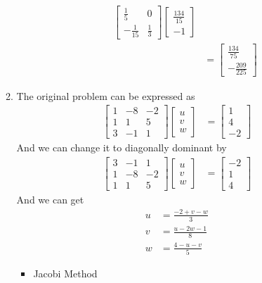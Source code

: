 \documentclass{article}
\begin{document}
\begin{enumerate}
\begin{enumerate}
\begin{itemize}
\begin{align*}
\begin{bmatrix}
\frac{1}{5} &0 \\ -\frac{1}{15} &\frac{1}{3}
\end{bmatrix}\begin{bmatrix}
\frac{134}{15}\\-1
\end{bmatrix}\\
&=\begin{bmatrix}
\frac{134}{75}\\-\frac{209}{225}
\end{bmatrix}
\end{align*}
\end{itemize}
\item The original problem can be expressed as \begin{align*}
\begin{bmatrix}
1&-8&-2\\1&1&5\\3&-1&1
\end{bmatrix}\begin{bmatrix}
u\\v\\w
\end{bmatrix}&=\begin{bmatrix}
1\\4\\-2
\end{bmatrix}
\end{align*}
And we can change it to diagonally dominant by 
\begin{align*}
\begin{bmatrix}
3&-1&1\\1&-8&-2\\1&1&5
\end{bmatrix}\begin{bmatrix}
u\\v\\w
\end{bmatrix}&=\begin{bmatrix}
-2\\1\\4
\end{bmatrix}
\end{align*}
And we can get \begin{align*}
u&= \frac{-2+v-w}{3}\\
v &=\frac{u-2w-1}{8}\\
w &= \frac{4-u-v}{5}
\end{align*}
\begin{itemize}
\item Jacobi Method
\begin{align*}

\end{align*}
\end{itemize}
\end{enumerate}
\end{enumerate}
\end{document}

